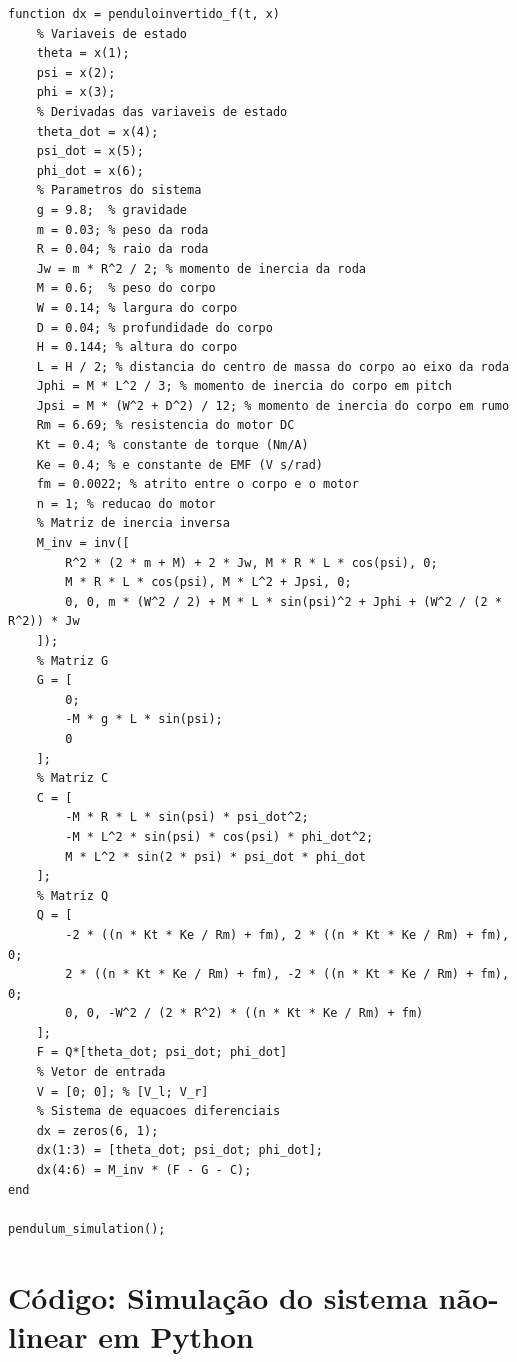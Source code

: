\documentclass[10pt]{article}
\begin{document}
\begin{appendices}
\begin{lstlisting}[caption={Código da simulação do sistema não-linear com ode45}, label=lst:pendulum_sim]
function dx = penduloinvertido_f(t, x)
    % Variaveis de estado
    theta = x(1);
    psi = x(2);
    phi = x(3);
    % Derivadas das variaveis de estado
    theta_dot = x(4);
    psi_dot = x(5);
    phi_dot = x(6);
    % Parametros do sistema
    g = 9.8;  % gravidade
    m = 0.03; % peso da roda
    R = 0.04; % raio da roda
    Jw = m * R^2 / 2; % momento de inercia da roda
    M = 0.6;  % peso do corpo
    W = 0.14; % largura do corpo
    D = 0.04; % profundidade do corpo
    H = 0.144; % altura do corpo
    L = H / 2; % distancia do centro de massa do corpo ao eixo da roda
    Jphi = M * L^2 / 3; % momento de inercia do corpo em pitch
    Jpsi = M * (W^2 + D^2) / 12; % momento de inercia do corpo em rumo
    Rm = 6.69; % resistencia do motor DC
    Kt = 0.4; % constante de torque (Nm/A)
    Ke = 0.4; % e constante de EMF (V s/rad)
    fm = 0.0022; % atrito entre o corpo e o motor
    n = 1; % reducao do motor
    % Matriz de inercia inversa
    M_inv = inv([
        R^2 * (2 * m + M) + 2 * Jw, M * R * L * cos(psi), 0;
        M * R * L * cos(psi), M * L^2 + Jpsi, 0;
        0, 0, m * (W^2 / 2) + M * L * sin(psi)^2 + Jphi + (W^2 / (2 * R^2)) * Jw
    ]);
    % Matriz G
    G = [
        0;
        -M * g * L * sin(psi);
        0
    ];
    % Matriz C
    C = [
        -M * R * L * sin(psi) * psi_dot^2;
        -M * L^2 * sin(psi) * cos(psi) * phi_dot^2;
        M * L^2 * sin(2 * psi) * psi_dot * phi_dot
    ];
    % Matriz Q
    Q = [
        -2 * ((n * Kt * Ke / Rm) + fm), 2 * ((n * Kt * Ke / Rm) + fm), 0;
        2 * ((n * Kt * Ke / Rm) + fm), -2 * ((n * Kt * Ke / Rm) + fm), 0;
        0, 0, -W^2 / (2 * R^2) * ((n * Kt * Ke / Rm) + fm)
    ];
    F = Q*[theta_dot; psi_dot; phi_dot]
    % Vetor de entrada
    V = [0; 0]; % [V_l; V_r]
    % Sistema de equacoes diferenciais
    dx = zeros(6, 1);
    dx(1:3) = [theta_dot; psi_dot; phi_dot];
    dx(4:6) = M_inv * (F - G - C);
end

pendulum_simulation();
\end{lstlisting}

\section{Código: Simulação do sistema não-linear em Python}


\end{appendices}
\end{document}
